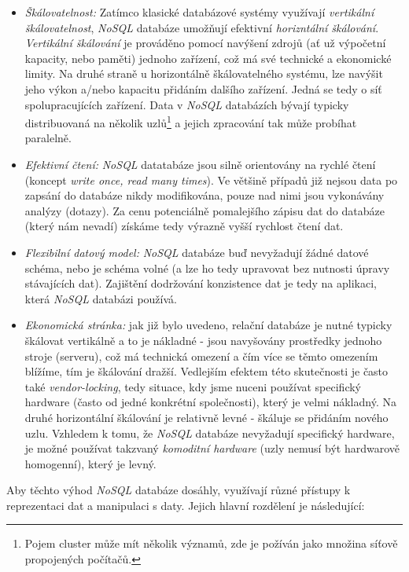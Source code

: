 \begin{itemize}
  \item{\textit{Škálovatelnost:}} Zatímco klasické databázové systémy využívají \textit{vertikální škálovatelnost}, \textit{NoSQL} databáze umožňují efektivní \textit{horizntální škálování}. \textit{Vertikální škálování} je prováděno pomocí navýšení zdrojů (ať už výpočetní kapacity, nebo paměti) jednoho zařízení, což má své technické a ekonomické limity. Na druhé straně u horizontálně škálovatelného systému, lze navýšit jeho výkon a/nebo kapacitu přidáním dalšího zařízení. Jedná se tedy o síť spolupracujících zařízení. Data v \textit{NoSQL} databázích bývají typicky distribuovaná na několik uzlů\footnote{Pojem cluster může mít několik významů, zde je požíván jako množina síťově propojených počítačů.} a jejich zpracování tak může probíhat paralelně.
  \item{\textit{Efektivní čtení:}} \textit{NoSQL} datatabáze jsou silně orientovány na rychlé čtení (koncept \textit{write once, read many times}). Ve většině případů již nejsou data po zapsání do databáze nikdy modifikována, pouze nad nimi jsou vykonávány analýzy (dotazy). Za cenu potenciálně pomalejšího zápisu dat do databáze (který nám nevadí) získáme tedy výrazně vyšší rychlost čtení dat.
  \item{\textit{Flexibilní datový model:}} \textit{NoSQL} databáze buď nevyžadují žádné datové schéma, nebo je schéma volné (a lze ho tedy upravovat bez nutnosti úpravy stávajících dat). Zajištění dodržování konzistence dat je tedy na aplikaci, která \textit{NoSQL} databázi používá.
  \item{\textit{Ekonomická stránka:}} jak již bylo uvedeno, relační databáze je nutné typicky škálovat vertikálně a to je nákladné - jsou navyšovány prostředky jednoho stroje (serveru), což má technická omezení a čím více se těmto omezením blížíme, tím je škálování dražší. Vedlejším efektem této skutečnosti je často také \textit{vendor-locking}, tedy situace, kdy jsme nuceni používat specifický hardware (často od jedné konkrétní společnosti), který je velmi nákladný. Na druhé horizontální škálování je relativně levné - škáluje se přidáním nového uzlu. Vzhledem k tomu, že \textit{NoSQL} databáze nevyžadují specifický hardware, je možné používat takzvaný \textit{komoditní hardware} (uzly nemusí být hardwarově homogenní), který je levný.
\end{itemize}

Aby těchto výhod \textit{NoSQL} databáze dosáhly, využívají různé přístupy k reprezentaci dat a manipulaci s daty. Jejich hlavní rozdělení je následující:

